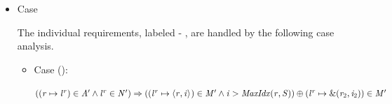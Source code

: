 \begin{bproof}
\begin{bcase}[\dregpardataconjoin{}]
\begin{enumerate}
\begin{itemize}
\begin{itemize}
\begin{itemize}
\begin{itemize}[label=$\circ$]
We can discharge this case by showing that the second disjunct holds.
%
There are two obligations: $\STOR''(\reg)(\indj_2) = \indirection{\reg_2}{\indj_3}$,
and $(\locreg{\loc_1}{\reg} \mapsto \concreteloc{\reg}{\indirection{\reg_2}{\indj_3}}{}) \in \MENV'$.
%
The first obligation discharges by inspecting the definition of $\tie$, which
writes the appropriate indirection to the store.
%
To discharge the second obligation, we perform inversion on Result~\ref{prf:wf-datacon-join-eqn2}.
%
By inversion, we know that 
must hold for $\MENV$.
%
And since $(\locreg{\loc}{\reg} \mapsto \concreteloc{\reg}{\indivar{\ivarid}}{}) \in \MENV$, the
second disjunct of 
must hold for $\MENV$.
%
Thus, we get
$(\locreg{\loc_1}{\reg} \mapsto \concreteloc{\reg}{\indirection{\reg_2}{\indj_3}}{}) \in \MENV$.
%
Since $\MENV'$ contains this mapping from $\MENV$,
$(\locreg{\loc_1}{\reg} \mapsto \concreteloc{\reg}{\indirection{\reg_2}{\indj_3}}{}) \in \MENV'$
holds as well.

\item Case  $\storewf{\SENV'}{\CENV'}{\AENV'}{\NENV'}{\TASKSET'}
  {\set{\locreg{\loc}{\reg} \mapsto \concreteloc{\reg}{\indj}{} \mid
  (\locreg{\loc}{\reg} \mapsto \concreteloc{\reg}{\indj}{}) \in \MENV,
  (\locreg{\loc}{\reg} \mapsto \concreteloc{\reg}{\indivar{\ivarid}}{}) \in \MENV_c}}
  {\STOR''}
  $

This case is identical to the previous one.

\end{itemize}

\item Case 

The individual requirements, labeled 
 -
,
are handled by the following case analysis.


\begin{itemize}[label=$\circ$]

\item Case ():

$ ((\mathit{r} \mapsto {\mathit{l}}^{\mathit{r}}) \in \mathit{A}' \wedge {\mathit{l}}^{\mathit{r}} \in \mathit{N}') \Rightarrow \\
          (({\mathit{l}}^{\mathit{r}} \mapsto \langle \mathit{r}, \mathit{i} \rangle ^{}) \in \mathit{M}' \wedge
          \mathit{i} > \mathit{MaxIdx}(\mathit{r},\mathit{S}))
          \oplus
          ({\mathit{l}}^{\mathit{r}} \mapsto \text{\&}(\mathit{r}_2,\mathit{i}_2)) \in \mathit{M}'
          $


\end{itemize}
\end{itemize}
\end{itemize}
\end{itemize}
\end{enumerate}
\end{bcase}
\end{bproof}
